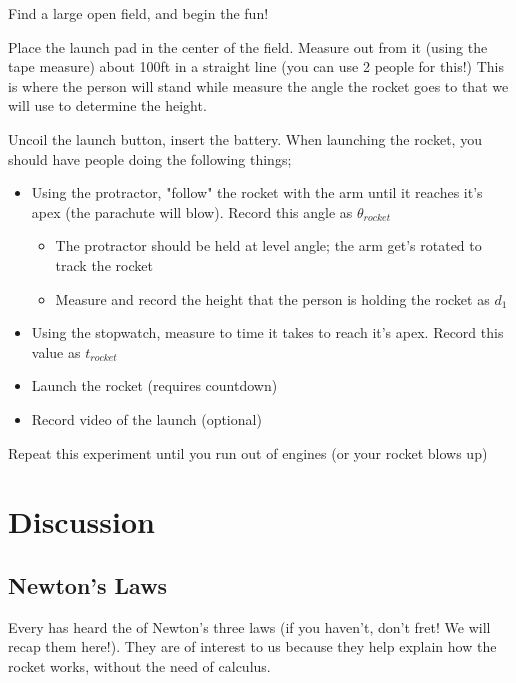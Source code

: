 \documentclass{article}
\begin{document}
Find a large open field, and begin the fun!

Place the launch pad in the center of the field.
Measure out from it (using the tape measure) about 100ft in a straight line (you can use 2 people for this!)
This is where the person will stand while measure the angle the rocket goes to that we will use to determine the height.

Uncoil the launch button, insert the battery.
When launching the rocket, you should have people doing the following things;
\begin{itemize}
	\item Using the protractor, "follow" the rocket with the arm until it reaches it's apex (the parachute will blow). Record this angle as $\theta_{rocket}$
	\begin{itemize}
		\item The protractor should be held at level angle; the arm get's rotated to track the rocket
		\item Measure and record the height that the person is holding the rocket as $d_1$
	\end{itemize}
	\item Using the stopwatch, measure to time it takes to reach it's apex. Record this value as $t_{rocket}$
	\item Launch the rocket (requires countdown)
	\item Record video of the launch (optional)
\end{itemize}

Repeat this experiment until you run out of engines (or your rocket blows up)

\section{Discussion}

\subsection{Newton's Laws}

Every has heard the of Newton's three laws (if you haven't, don't fret! We will recap them here!).
They are of interest to us because they help explain how the rocket works, without the need of calculus.
\end{document}
